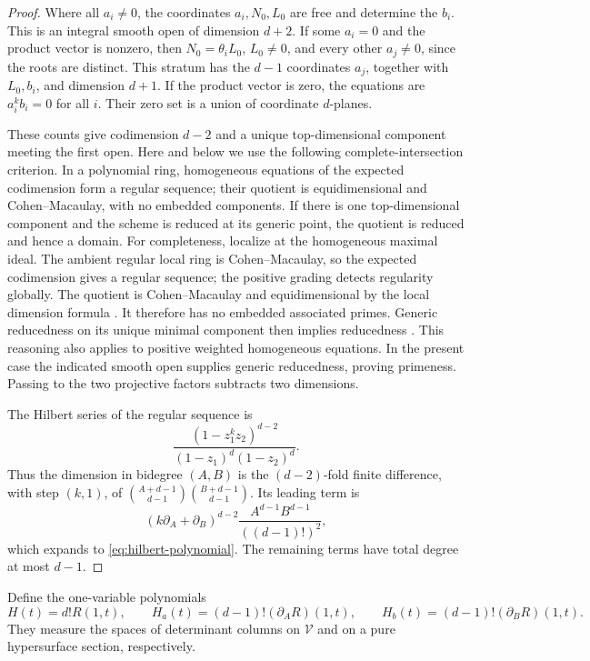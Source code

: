 \begin{proof}
Where all \(a_i\ne0\), the coordinates \(a_i,N_0,L_0\) are free and
determine the \(b_i\).  This is an integral smooth open of dimension
\(d+2\).  If some \(a_i=0\) and the product vector is nonzero, then
\(N_0=\theta_iL_0\), \(L_0\ne0\), and every other \(a_j\ne0\), since
the roots are distinct.  This stratum has the \(d-1\) coordinates
\(a_j\), together with \(L_0,b_i\), and dimension \(d+1\).
If the product vector is zero, the equations are
\(a_i^kb_i=0\) for all \(i\).  Their zero set is a union of coordinate
\(d\)-planes.

These counts give codimension \(d-2\) and a unique top-dimensional
component meeting the first open.  Here and below we use the following
complete-intersection criterion.  In a polynomial ring, homogeneous
equations of the expected codimension form a regular sequence; their
quotient is equidimensional and Cohen--Macaulay, with no embedded
components.  If there
is one top-dimensional component and the scheme is reduced at its
generic point, the quotient is reduced and hence a domain.
For completeness, localize at the homogeneous maximal ideal.  The
ambient regular local ring is Cohen--Macaulay, so the expected
codimension gives a regular sequence; the positive grading detects
regularity globally.  The quotient is Cohen--Macaulay and
equidimensional by the local dimension formula
\cite[Tags 00NQ, 02JN, 00NB, and 00NA]{stacks-project}.
It therefore has no embedded associated primes.  Generic reducedness
on its unique minimal component then implies reducedness
\cite[Tags 031Q and 031R]{stacks-project}.
This reasoning also applies to positive weighted homogeneous equations.
In the present case the indicated smooth open supplies generic
reducedness, proving primeness.  Passing to the two projective factors
subtracts two dimensions.

The Hilbert series of the regular sequence is
\[
 \frac{(1-z_1^kz_2)^{d-2}}{(1-z_1)^d(1-z_2)^d}.
\]
Thus the dimension in bidegree \((A,B)\) is the \((d-2)\)-fold
finite difference, with step \((k,1)\), of
\(\binom{A+d-1}{d-1}\binom{B+d-1}{d-1}\).
Its leading term is
\[
 (k\partial_A+\partial_B)^{d-2}
 \frac{A^{d-1}B^{d-1}}{((d-1)!)^2},
\]
which expands to \eqref{eq:hilbert-polynomial}.  The remaining terms
have total degree at most \(d-1\).
\end{proof}

Define the one-variable polynomials
\[
 H(t)=d!R(1,t),\qquad
 H_a(t)=(d-1)!(\partial_A R)(1,t),\qquad
 H_b(t)=(d-1)!(\partial_B R)(1,t).
\]
They measure the spaces of determinant columns on \(\mathcal V\)
and on a pure hypersurface section, respectively.

